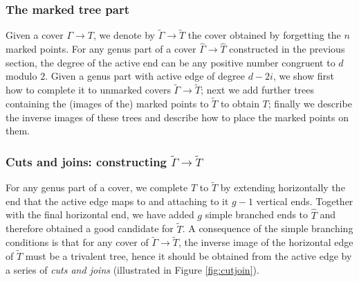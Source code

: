 \documentclass[11pt,reqno]{amsart}
\theoremstyle{definition}
\newcommand{\gGamma}{\widehat{\Gamma}}
\newcommand{\gT}{\widehat{T}}
\begin{document}
\subsubsection{The marked tree part}
\label{sec:markings}

Given a cover $\Gamma\to T$, we denote by $\tilde{\Gamma}\to \tilde{T}$ the cover obtained by forgetting the $n$ marked points. For any genus part of a cover $\gGamma\to \gT$ constructed in the previous section, %
the degree of the active end can be any positive number congruent to $d$ modulo $2$. Given a genus part with active edge of degree $d-2i$, we show first how to complete it to unmarked covers $\tilde{\Gamma}\to \tilde{T}$; next we add further trees containing the (images of the) marked points to $\tilde{T}$ to obtain $T$; finally we describe the inverse images of these trees and describe how to place the marked points on them.

\subsubsection*{Cuts and joins: constructing $\tilde{\Gamma}\to \tilde{T}$}

For any genus part of a cover, we complete $\gT$ to $\tilde{T}$ by extending horizontally the end that the active edge maps to and attaching to it $g-1$ vertical ends. Together with the final horizontal end, we have added $g$ simple branched ends to $\gT$ and therefore obtained a good candidate for $\tilde{T}$.
A consequence of the simple branching conditions is that for any cover of $\tilde\Gamma\to \tilde{T}$, the inverse image of the horizontal edge of $\tilde{T}$ must be a trivalent tree, hence it should be obtained from the active edge by a series of {\it cuts and joins} (illustrated in Figure \ref{fig:cutjoin}).
\end{document}
